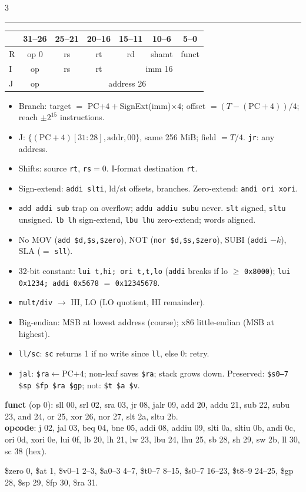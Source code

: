 \documentclass[10pt]{extarticle}
\newcounter{cs}
\newcommand{\cs}[1]{\par\needspace{5\baselineskip}\vspace{2.5pt}\refstepcounter{cs}%
  \noindent{\bfseries\thecs.\ #1}\par\vspace{0.5pt}\hrule\vspace{1.5pt}}
\newcommand{\tw}[1]{\texttt{#1}}
\begin{document}
\begin{multicols*}{3}
\cs{MIPS}
{\scriptsize
\begin{tabular*}{\linewidth}{@{\extracolsep{\fill}}lcccccc@{}}
\toprule
& 31--26 & 25--21 & 20--16 & 15--11 & 10--6 & 5--0\\
\midrule
R & op 0 & rs & rt & rd & shamt & funct\\
I & op & rs & rt & \multicolumn{3}{c}{imm 16}\\
J & op & \multicolumn{5}{c}{address 26}\\
\bottomrule
\end{tabular*}}
\begin{itemize}
  \item Branch: target $=$ PC$+4+$SignExt(imm)$\times4$; offset
  $=(T-(\text{PC}+4))/4$; reach $\pm2^{15}$ instructions.
  \item J: $\{(\text{PC}+4)[31{:}28],\text{addr},00\}$, same 256 MiB; field $=T/4$.
  \tw{jr}: any address.
  \item Shifts: source \tw{rt}, \tw{rs}$=0$. I-format destination \tw{rt}.
  \item Sign-extend: \tw{addi slti}, ld/st offsets, branches. Zero-extend:
  \tw{andi ori xori}.
  \item \tw{add addi sub} trap on overflow; \tw{addu addiu subu} never. \tw{slt}
  signed, \tw{sltu} unsigned. \tw{lb lh} sign-extend, \tw{lbu lhu} zero-extend;
  words aligned.
  \item No MOV (\tw{add \$d,\$s,\$zero}), NOT (\tw{nor \$d,\$s,\$zero}), SUBI
  (\tw{addi} $-k$), SLA ($=$ \tw{sll}).
  \item 32-bit constant: \tw{lui t,hi; ori t,t,lo} (\tw{addi} breaks if lo $\ge$
  \tw{0x8000}); \tw{lui 0x1234; addi 0x5678} $=$ \tw{0x12345678}.
  \item \tw{mult/div} $\to$ HI, LO (LO quotient, HI remainder).
  \item Big-endian: MSB at lowest address (course); x86 little-endian (MSB at
  highest).
  \item \tw{ll/sc}: \tw{sc} returns 1 if no write since \tw{ll}, else 0: retry.
  \item \tw{jal}: \tw{\$ra}$\leftarrow$PC$+4$; non-leaf saves \tw{\$ra}; stack
  grows down. Preserved: \tw{\$s0--7 \$sp \$fp \$ra \$gp}; not: \tw{\$t \$a \$v}.
\end{itemize}
{\scriptsize
\textbf{funct} (op 0): sll 00, srl 02, sra 03, jr 08, jalr 09, add 20, addu 21,
sub 22, subu 23, and 24, or 25, xor 26, nor 27, slt 2a, sltu 2b.\\
\textbf{opcode}: j 02, jal 03, beq 04, bne 05, addi 08, addiu 09, slti 0a, sltiu 0b,
andi 0c, ori 0d, xori 0e, lui 0f, lb 20, lh 21, lw 23, lbu 24, lhu 25, sb 28, sh 29,
sw 2b, ll 30, sc 38 (hex).\par}
\$zero 0, \$at 1, \$v0--1 2--3, \$a0--3 4--7, \$t0--7 8--15, \$s0--7 16--23,
\$t8--9 24--25, \$gp 28, \$sp 29, \$fp 30, \$ra 31.


\end{multicols*}
\end{document}
